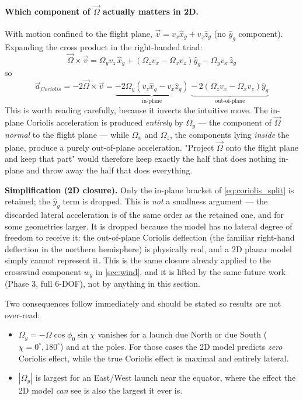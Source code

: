 {\paragraph{Which component of $\vec{\Omega}$ actually matters in 2D.} With motion confined to
the flight plane, $\vec{v} = v_x\hat{x}_g + v_z\hat{z}_g$ (no $\hat{y}_g$ component). Expanding
the cross product in the right-handed triad:
\begin{equation}
    \vec{\Omega}\times\vec{v} =
        \Omega_yv_z\,\hat{x}_g
        + \left(\Omega_zv_x - \Omega_xv_z\right)\hat{y}_g
        - \Omega_yv_x\,\hat{z}_g
\end{equation}
so
\begin{equation} \label{eq:coriolis_split}
    \vec{a}_{Coriolis} = -2\vec{\Omega}\times\vec{v} =
        \underbrace{-2\Omega_y\left(v_z\hat{x}_g - v_x\hat{z}_g\right)}_{\text{in-plane}}
        \;\underbrace{-\,2\left(\Omega_zv_x - \Omega_xv_z\right)\hat{y}_g}_{\text{out-of-plane}}
\end{equation}
This is worth reading carefully, because it inverts the intuitive move. The in-plane Coriolis
acceleration is produced \emph{entirely} by $\Omega_y$ --- the component of $\vec{\Omega}$
\emph{normal} to the flight plane --- while $\Omega_x$ and $\Omega_z$, the components lying
\emph{inside} the plane, produce a purely out-of-plane acceleration. "Project $\vec{\Omega}$ onto
the flight plane and keep that part" would therefore keep exactly the half that does nothing
in-plane and throw away the half that does everything.

\textbf{Simplification (2D closure).} Only the in-plane bracket of
\autoref{eq:coriolis_split} is retained; the $\hat{y}_g$ term is dropped. This is \emph{not} a
smallness argument --- the discarded lateral acceleration is of the same order as the retained
one, and for some geometries larger. It is dropped because the model has no lateral degree of
freedom to receive it: the out-of-plane Coriolis deflection (the familiar right-hand deflection
in the northern hemisphere) is physically real, and a 2D planar model simply cannot represent it.
This is the same closure already applied to the crosswind component $w_y$ in \autoref{sec:wind}, and it is
lifted by the same future work (Phase 3, full 6-DOF), not by anything in this section.

Two consequences follow immediately and should be stated so results are not over-read:
\begin{itemize}
    \item $\Omega_y = -\Omega\cos\phi_0\sin\chi$ vanishes for a launch due North or due South
    ($\chi = 0^\circ, 180^\circ$) and at the poles. For those cases the 2D model predicts
    \emph{zero} Coriolis effect, while the true Coriolis effect is maximal and entirely lateral.
    \item $|\Omega_y|$ is largest for an East/West launch near the equator, where the effect the
    2D model \emph{can} see is also the largest it ever is.
\end{itemize}

}
